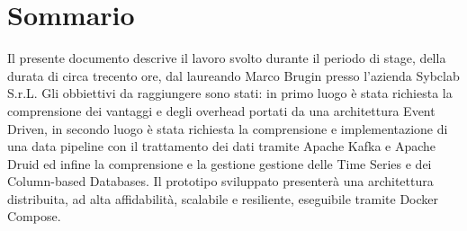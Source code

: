 \cleardoublepage
{}
{}
\begingroup
\let\clearpage\relax
\let\cleardoublepage\relax
\let\cleardoublepage\relax

\chapter*{Sommario}

Il presente documento descrive il lavoro svolto durante il periodo di stage, della durata di circa trecento ore, dal laureando Marco Brugin presso l'azienda Sybclab S.r.L.
Gli obbiettivi da raggiungere sono stati:
in primo luogo è stata richiesta la comprensione dei vantaggi e degli overhead portati da una architettura Event Driven,
in secondo luogo è stata richiesta la comprensione e implementazione di una data pipeline con il trattamento dei dati tramite Apache Kafka e Apache Druid ed infine la comprensione e la gestione gestione delle Time Series e dei Column-based Databases.
Il prototipo sviluppato presenterà una architettura distribuita, ad alta affidabilità, scalabile e resiliente, eseguibile tramite Docker Compose.



\endgroup

\vfill

